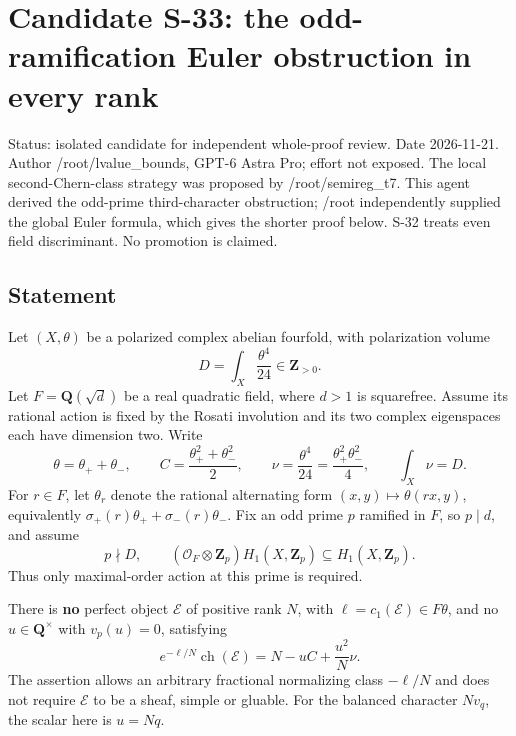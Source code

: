 \providecommand{\tightlist}{\setlength{\itemsep}{0pt}\setlength{\parskip}{0pt}}
\section{Candidate S-33: the odd-ramification Euler obstruction in every rank}\label{candidate-s-33-the-odd-ramification-euler-obstruction-in-every-rank}

Status: isolated candidate for independent whole-proof review. Date 2026-11-21. Author /root/lvalue\_bounds, GPT-6 Astra Pro; effort not exposed. The local second-Chern-class strategy was proposed by /root/semireg\_t7. This agent derived the odd-prime third-character obstruction; /root independently supplied the global Euler formula, which gives the shorter proof below. S-32 treats even field discriminant. No promotion is claimed.

\subsection{Statement}\label{statement}

Let \((X,\theta)\) be a polarized complex abelian fourfold, with polarization volume \[
 D=\int_X\frac{\theta^4}{24}\in\mathbf Z_{>0}.
\] Let \(F=\mathbf Q(\sqrt d)\) be a real quadratic field, where \(d>1\) is squarefree. Assume its rational action is fixed by the Rosati involution and its two complex eigenspaces each have dimension two. Write \[
 \theta=\theta_++\theta_-,\qquad
 C=\frac{\theta_+^2+\theta_-^2}{2},\qquad
 \nu=\frac{\theta^4}{24}
      =\frac{\theta_+^2\theta_-^2}{4},\qquad \int_X\nu=D.
 \tag{S33.1}
\] For \(r\in F\), let \(\theta_r\) denote the rational alternating form \((x,y)\mapsto\theta(rx,y)\), equivalently \(\sigma_+(r)\theta_++\sigma_-(r)\theta_-\). Fix an odd prime \(p\) ramified in \(F\), so \(p\mid d\), and assume \[
 p\nmid D,\qquad
 (\mathcal O_F\otimes\mathbf Z_p)H_1(X,\mathbf Z_p)
                  \subseteq H_1(X,\mathbf Z_p).
 \tag{S33.2}
\] Thus only maximal-order action at this prime is required.

There is \textbf{no} perfect object \(\mathcal E\) of positive rank \(N\), with \(\ell=c_1(\mathcal E)\in F\theta\), and no \(u\in\mathbf Q^\times\) with \(v_p(u)=0\), satisfying \[
 e^{-\ell/N}\operatorname{ch}(\mathcal E)
       =N-uC+\frac{u^2}{N}\nu.
 \tag{S33.3}
\] The assertion allows an arbitrary fractional normalizing class \(-\ell/N\) and does not require \(\mathcal E\) to be a sheaf, simple or gluable. For the balanced character \(Nv_q\), the scalar here is \(u=Nq\).

